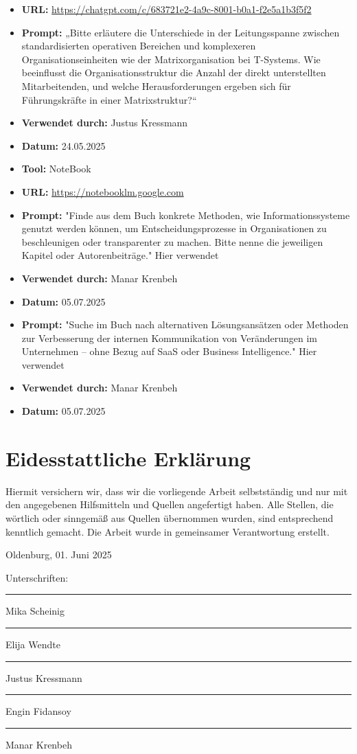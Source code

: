 \documentclass[12pt,a4paper]{article}
\begin{document}
	\begin{itemize}
		\item \textbf{URL:} \url{https://chatgpt.com/c/683721e2-4a9c-8001-b0a1-f2e5a1b3f5f2}
		\item \textbf{Prompt:} „Bitte erläutere die Unterschiede in der Leitungsspanne zwischen standardisierten operativen Bereichen und komplexeren Organisationseinheiten wie der Matrixorganisation bei T-Systems. Wie beeinflusst die Organisationsstruktur die Anzahl der direkt unterstellten Mitarbeitenden, und welche Herausforderungen ergeben sich für Führungskräfte in einer Matrixstruktur?“
		\item \textbf{Verwendet durch:} Justus Kressmann
		\item \textbf{Datum:} 24.05.2025
		\item \textbf{Tool:} NoteBook
		\item \textbf{URL:} \url{https://notebooklm.google.com}
		\item \textbf{Prompt:} "Finde aus dem Buch konkrete Methoden, wie Informationssysteme genutzt werden können, um Entscheidungsprozesse in Organisationen zu beschleunigen oder transparenter zu machen. Bitte nenne die jeweiligen Kapitel oder Autorenbeiträge." Hier \parencite{StelzerDirk1962-2011I:GA} verwendet
		\item \textbf{Verwendet durch:} Manar Krenbeh
		\item \textbf{Datum:} 05.07.2025
		\item \textbf{Prompt:} "Suche im Buch nach alternativen Lösungsansätzen oder Methoden zur Verbesserung der internen Kommunikation von Veränderungen im Unternehmen – ohne Bezug auf SaaS oder Business Intelligence." Hier \parencite{kumkale_organizational_2022} verwendet
		\item \textbf{Verwendet durch:} Manar Krenbeh
		\item \textbf{Datum:} 05.07.2025
	\end{itemize}
	
	\newpage
	\section*{Eidesstattliche Erklärung}
	Hiermit versichern wir, dass wir die vorliegende Arbeit selbstständig und nur mit den angegebenen Hilfsmitteln und Quellen angefertigt haben. Alle Stellen, die wörtlich oder sinngemäß aus Quellen übernommen wurden, sind entsprechend kenntlich gemacht. Die Arbeit wurde in gemeinsamer Verantwortung erstellt.
	
	\vspace{2cm}
	Oldenburg, 01. Juni 2025
	
	Unterschriften: \\
	\rule{5cm}{0.4pt} Mika Scheinig \\
	\rule{5cm}{0.4pt} Elija Wendte \\
	\rule{5cm}{0.4pt} Justus Kressmann \\
	\rule{5cm}{0.4pt} Engin Fidansoy \\
	\rule{5cm}{0.4pt} Manar Krenbeh
	
\end{document}
